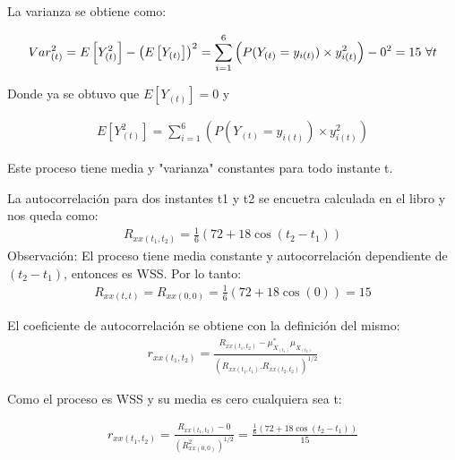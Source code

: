 La varianza se obtiene como:

\begin{equation*}
\begin{gathered}
	Var^{2}_{(t)} = E\left[Y_{(t)}^{2}\right]- \left(E\left[Y_{(t)}\right]\right)^{2}  = \sum_{i=1}^{6}\left( P(Y_{(t)} = y_{i(t)}) \times y_{i(t)}^{2}\right) - 0^2 = 15 $   $ \forall t 
\end{gathered}
\end{equation*}

Donde ya se obtuvo que $E\left[Y_{(t)}\right] = 0$ y 

\begin{equation*}
\begin{gathered}
	E\left[Y_{(t)}^{2}\right] = \sum_{i=1}^{6}\left( P(Y_{(t)} = y_{i(t)}) \times y_{i(t)}^{2}\right) 
\end{gathered}
\end{equation*}

Este proceso tiene media y "varianza" constantes para todo instante t.

La autocorrelación para dos instantes t1 y t2 se encuetra calculada en el libro y nos queda como:
\begin{equation*}
\begin{gathered}
	R_{xx(t_1,t_2)} = \frac{1}{6}\left(72+ 18 \cos(t_2 - t_1)\right)
\end{gathered}
\end{equation*}
Observación: El proceso tiene media constante y autocorrelación dependiente de $(t_2 - t_1)$, entonces es WSS. Por lo tanto:
\begin{equation*}
\begin{gathered}
	R_{xx(t,t)} = R_{xx(0,0)} = \frac{1}{6}\left(72+ 18 \cos(0)\right) = 15
\end{gathered}
\end{equation*}

El coeficiente de autocorrelación se obtiene con la definición del mismo:
\begin{equation*}
\begin{gathered}
	r_{xx(t_1,t_2)} = \frac{R_{xx(t_1,t_2)}-\mu_{X_{(t_1)}}^{*} \mu_{X_{(t_2)}}}{\left(R_{xx(t_1,t_1)}.R_{xx(t_2,t_2)}\right)^{1/2}} 
\end{gathered}
\end{equation*}

Como el proceso es WSS y su media es cero cualquiera sea t:

\begin{equation*}
\begin{gathered}
	r_{xx(t_1,t_2)} = \frac{R_{xx(t_1,t_2)}-0}{(R_{xx(0,0)}^2)^{1/2}} = \frac{\frac{1}{6}\left(72+ 18 \cos(t_2 - t_1)\right)}{15}
\end{gathered}
\end{equation*}

